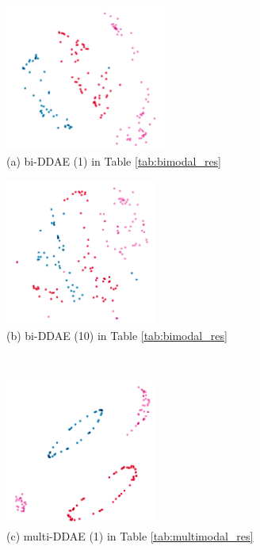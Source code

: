 \begin{figure}[htb]
    \centering
    \small
    \begin{minipage}[c]{0.4\linewidth}
    \centering
    \includegraphics[height=4.8cm]{images/results/bi_DDAE_MFCC_tsne.png} \\
    (a) bi-DDAE (1) in Table \ref{tab:bimodal_res}
    \end{minipage}
    \begin{minipage}[c]{0.4\linewidth}
    \centering
    \includegraphics[height=4.8cm]{images/results/bi_DDAE_eGeMAPS_tsne.png} \\
    (b) bi-DDAE (10) in Table \ref{tab:bimodal_res}
    \end{minipage}
    \\
    \begin{minipage}[c]{0.4\linewidth}
    \centering
    \includegraphics[height=4.8cm]{images/results/multi_DDAE_MFCC_tsne.png} \\
    (c) multi-DDAE (1) in Table \ref{tab:multimodal_res}
    \end{minipage}
    \begin{minipage}[c]{0.4\linewidth}

\end{minipage}
\end{figure}
